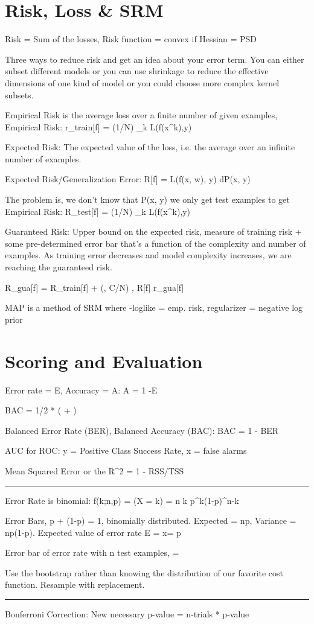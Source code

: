 \documentclass[a4paper,twoside,twocolumn]{article}
\begin{document}
\section*{Risk, Loss \& SRM}
\label{sec-11}
\setlength{\parindent}{0pt}
{\scriptsize
Risk = Sum of the losses, Risk function = convex if Hessian = PSD

Three ways to reduce risk and get an idea about your error term. You can either subset different models or you can use shrinkage to reduce the effective dimensions of one kind of model or you could choose more complex kernel subsets.

Empirical Risk is the average loss over a finite number of given examples, Empirical Risk: r_{train}[f] = (1/N) \Sigma_k L(f(x^k),y)

Expected Risk: The expected value of the loss, i.e. the average over an infinite number of examples.

Expected Risk/Generalization Error: R[f] = \int L(f(x, w), y) dP(x, y)

The problem is, we don't know that P(x, y) we only get test examples to get Empirical Risk: R_{test}[f] = (1/N) \Sigma_k L(f(x^k),y)

Guaranteed Risk: Upper bound on the expected risk, measure of training risk + some pre-determined error bar that's a function of the complexity and number of examples. As training error decreases and model complexity increases, we are reaching the guaranteed risk.

R_{gua}[f] = R_{train}[f] + \ep(\delta, C/N) , R[f] \leq r_{gua}[f]

MAP is a method of SRM where -loglike = emp. risk, regularizer = negative log prior
}

\section*{Scoring and Evaluation}
\label{sec-12}
\setlength{\parindent}{0pt}
{\scriptsize
Error rate = E, Accuracy = A: A = 1 -E

BAC = 1/2 * (  + )

Balanced Error Rate (BER), Balanced Accuracy (BAC): BAC = 1 - BER

AUC for ROC: y = Positive Class Success Rate, x = false alarms

Mean Squared Error or the R^2 = 1 - RSS/TSS

\noindent\rule{8cm}{0.4pt}

Error Rate is binomial:  f(k;n,p) = \Pr(X = k) = \binom n k  p^k(1-p)^{n-k}

Error Bars, p + (1-p) = 1, binomially distributed. Expected = np, Variance = np(1-p). Expected value of error rate E = x\n = p

Error bar of error rate with n test examples, \sigma = 

Use the bootstrap rather than knowing the distribution of our favorite cost function. Resample with replacement.

\noindent\rule{8cm}{0.4pt}

Bonferroni Correction: New necessary p-value = n-trials * p-value

}
\end{document}
